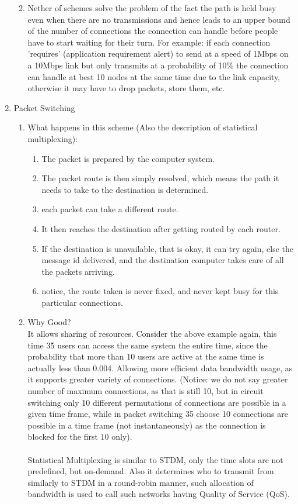 \documentclass[12pt]{book}
\begin{document}
\begin{enumerate}
\begin{enumerate}
\begin{enumerate}
            \end{enumerate}
            \item Nether of schemes solve the problem of the fact the path is held busy even when there are no transmissions and hence leads to an upper bound of the number of connections the connection can handle before people have to start waiting for their turn. For example: if each connection 'requires' (application requirement alert) to send at a speed of 1Mbps on a 10Mbps link but only transmits at a probability of 10\% the connection can handle at best 10 nodes at the same time due to the link capacity, otherwise it may have to drop packets, store them, etc.
    \end{enumerate}
    \item Packet Switching
    \begin{enumerate}
        \item What happens in this scheme (Also the description of statistical multiplexing):
        \begin{enumerate}
            \item The packet is prepared by the computer system.
            \item The packet route is then simply resolved, which means the path it needs to take to the destination is determined.
            \item each packet can take a different route.
            \item It then reaches the destination after getting routed by each router.
            \item If the destination is unavailable, that is okay, it can try again, else the message id delivered, and the destination computer takes care of all the packets arriving.
            \item notice, the route taken is never fixed, and never kept busy for this particular connections.
        \end{enumerate}
        \item Why Good?\\
        It allows sharing of resources. Consider the above example again, this time 35 users can access the same system the entire time, since the probability that more than 10 users are active at the same time is actually less than 0.004. Allowing more efficient data bandwidth usage, as it supports greater variety of connections. (Notice: we do not say greater number of maximum connections, as that is still 10, but in circuit switching only 10 different permutations of connections are possible in a given time frame, while in packet switching 35 choose 10 connections are possible in a time frame (not instantaneously) as the connection is blocked for the first 10 only).\\\\
        Statistical Multiplexing is similar to STDM, only the time slots are not predefined, but on-demand. Also it determines who to transmit from similarly to STDM in a round-robin manner, such allocation of bandwidth is used to call such networks having Quality of Service (QoS).
    \end{enumerate}
\end{enumerate}
\end{document}
